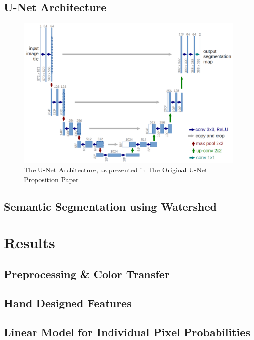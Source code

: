 \documentclass[paper=letter, fontsize=12pt]{article}
\numberwithin{equation}{section} %
\numberwithin{figure}{section} %
\numberwithin{table}{section} %
\begin{document}
 \begin{appendixatend}
     \subsection{U-Net Architecture}
     \begin{figure}
         \centering
         \includegraphics[width=\textwidth]{./figs/unet_architecture.png}
         \caption{The U-Net Architecture, as presented in  \href{https://arxiv.org/pdf/1505.04597.pdf}{The Original U-Net Proposition Paper} }
         \label{fig:unet-architecture}
     \end{figure}
 \end{appendixatend}



\subsection{Semantic Segmentation using Watershed}

\section{Results}

\subsection{Preprocessing \& Color Transfer}

\subsection{Hand Designed Features}

\subsection{Linear Model for Individual Pixel Probabilities}
\end{document}
